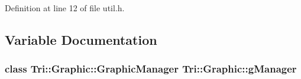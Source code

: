 Definition at line 12 of file util.\+h.



\subsection{Variable Documentation}
\hypertarget{namespace_tri_1_1_graphic_a733d59e2e37ba2f7cf31356f228cdffc}{}
\subsubsection[{g\+Manager}]{\setlength{\rightskip}{0pt plus 5cm}class {\bf Tri\+::\+Graphic\+::\+Graphic\+Manager}  Tri\+::\+Graphic\+::g\+Manager}\label{namespace_tri_1_1_graphic_a733d59e2e37ba2f7cf31356f228cdffc}
